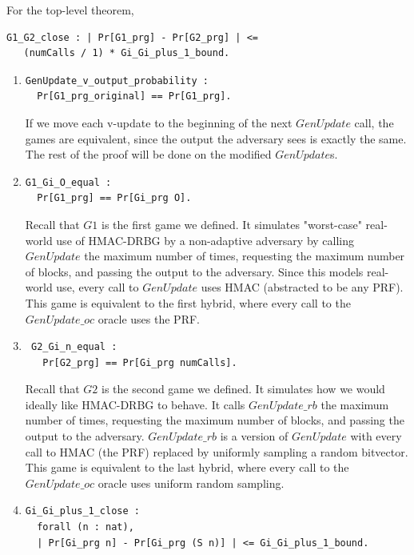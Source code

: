 \documentclass[12pt,lot, lof]{puthesis}
\begin{document}
{For the top-level theorem, 
\begin{lstlisting}
G1_G2_close : | Pr[G1_prg] - Pr[G2_prg] | <= 
   (numCalls / 1) * Gi_Gi_plus_1_bound.
\end{lstlisting}
\begin{enumerate}
\par
\item \begin{lstlisting}
GenUpdate_v_output_probability :
  Pr[G1_prg_original] == Pr[G1_prg].
  \end{lstlisting}
If we move each v-update to the beginning of the next $GenUpdate$ call, the games are equivalent, since the output the adversary sees is exactly the same. The rest of the proof will be done on the modified $GenUpdate$s.

\par
\item \begin{lstlisting}
G1_Gi_O_equal :
  Pr[G1_prg] == Pr[Gi_prg O].
\end{lstlisting}   

Recall that $G1$ is the first game we defined. It simulates "worst-case" real-world use of HMAC-DRBG by a non-adaptive adversary by calling $GenUpdate$ the maximum number of times, requesting the maximum number of blocks, and passing the output to the adversary. Since this models real-world use, every call to $GenUpdate$ uses HMAC (abstracted to be any PRF). This game is equivalent to the first hybrid, where every call to the $GenUpdate\_oc$ oracle uses the PRF.

\par
\item \begin{lstlisting}
 G2_Gi_n_equal :
   Pr[G2_prg] == Pr[Gi_prg numCalls].
  \end{lstlisting}

Recall that $G2$ is the second game we defined. It simulates how we would ideally like HMAC-DRBG to behave. It calls $GenUpdate\_rb$ the maximum number of times, requesting the maximum number of blocks, and passing the output to the adversary. $GenUpdate\_rb$ is a version of $GenUpdate$ with every call to HMAC (the PRF) replaced by uniformly sampling a random bitvector. This game is equivalent to the last hybrid, where every call to the $GenUpdate\_oc$ oracle uses uniform random sampling.

\par 
\item \begin{lstlisting}
Gi_Gi_plus_1_close :
  forall (n : nat),
  | Pr[Gi_prg n] - Pr[Gi_prg (S n)] | <= Gi_Gi_plus_1_bound.
  \end{lstlisting}


\end{enumerate}}
\end{document}
